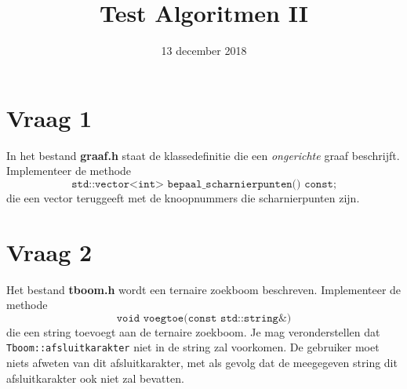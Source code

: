 \documentclass{article}
\begin{document}
\title{Test Algoritmen II}
\date{13 december 2018}
\author{}
\maketitle

\section{Vraag 1}
    In het bestand \textbf{graaf.h} staat de klassedefinitie die een \textit{ongerichte} graaf beschrijft. Implementeer de methode 
    $$\texttt{std::vector<int> bepaal\_scharnierpunten() const;}$$
    die een vector teruggeeft met de knoopnummers die scharnierpunten zijn.
\section{Vraag 2}
    Het bestand \textbf{tboom.h} wordt een ternaire zoekboom beschreven. Implementeer de methode
    $$\texttt{void voegtoe(const std::string\&)}$$
    die een string toevoegt aan de ternaire zoekboom. Je mag veronderstellen dat \texttt{Tboom::afsluitkarakter} niet in de string zal voorkomen. De gebruiker moet niets afweten van dit afsluitkarakter, met als gevolg dat de meegegeven string dit afsluitkarakter ook niet zal bevatten.
	
    
\end{document}
